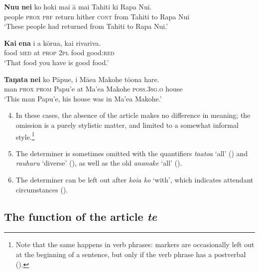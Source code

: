 \ea\label{ex:5.23}
\gll \textbf{Nu{\ꞌ}u} \textbf{nei} ko hoki mai {\ꞌ}ā mai Tahiti ki Rapa Nui.  \\
people \textsc{prox} \textsc{prf} return hither \textsc{cont} from Tahiti to Rapa Nui  \\

\glt 
‘These people had returned from Tahiti to Rapa Nui.’ \textstyleExampleref{[R231.086]} 
\z

\ea\label{ex:5.24}
\gll \textbf{Kai} \textbf{ena} i a kōrua, kai rivariva. \\
food \textsc{med} at \textsc{prop} \textsc{2pl} food good:\textsc{red} \\

\glt 
‘That food you have is good food.’ \textstyleExampleref{[R310.262]} 
\z

\ea\label{ex:5.25}
\gll \textbf{Taŋata} \textbf{nei} ko Pāpu{\ꞌ}e, {\ꞌ}i Mā{\ꞌ}ea Makohe tō{\ꞌ}ona hare. \\
man \textsc{prox} \textsc{prom} Papu’e at Ma’ea Makohe \textsc{poss.3sg.o} house \\

\glt
‘This man Papu’e, his house was in Ma’ea Makohe.’ \textstyleExampleref{[R372.035]} 
\z

\begin{enumerate}
\setcounter{enumi}{3}
\item[]
In these cases, the absence of the article makes no difference in meaning; the omission is a purely stylistic matter, and limited to a somewhat informal style.\footnote{\label{fn:248}Note that the same happens in verb phrases:  markers are occasionally left out at the beginning of a sentence, but only if the verb phrase has a postverbal  ().}

\item
The determiner is sometimes omitted with the quantifiers \textit{\mbox{ta{\ꞌ}ato{\ꞌ}a}} ‘all’ () and \textit{rauhuru} ‘diverse’ (), as well as the old  \textit{ana\-nake} ‘all’ ().

\item 
The determiner can be left out after \textit{koia ko} ‘with’, which indicates attendant circumstances ().
\end{enumerate}

\subsection{The function of the article \textit{te}}\label{sec:5.3.3}

